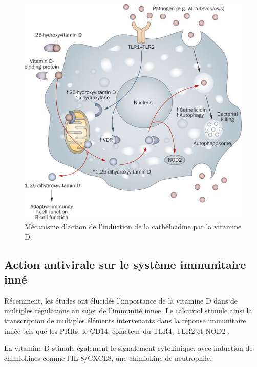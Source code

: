 \documentclass[
  a4paper,
  DIV=11,
  numbers=noendperiod,
  listof=totoc]{scrreprt}
\begin{document}
\begin{figure}

{\centering \includegraphics{figures/vd-mecha-cathelicidin.jpg}

}

\caption{Mécanisme d'action de l'induction de la cathélicidine par la
vitamine D.}

\end{figure}

\hypertarget{action-antivirale-sur-le-systuxe8me-immunitaire-innuxe9}{%
\subsection{Action antivirale sur le système immunitaire
inné}\label{action-antivirale-sur-le-systuxe8me-immunitaire-innuxe9}}

Récemment, les études ont élucidés l'importance de la vitamine D dans de
multiples régulations au sujet de l'immunité innée. Le calcitriol
stimule ainsi la transcription de multiples éléments intervenants dans
la réponse immunitaire innée tels que les PRRs, le CD14, cofacteur du
TLR4, TLR2 et NOD2 \autocite{White.2022}.

La vitamine D stimule également le signalement cytokinique, avec
induction de chimiokines comme l'IL-8/CXCL8, une chimiokine de
neutrophile.
\end{document}
